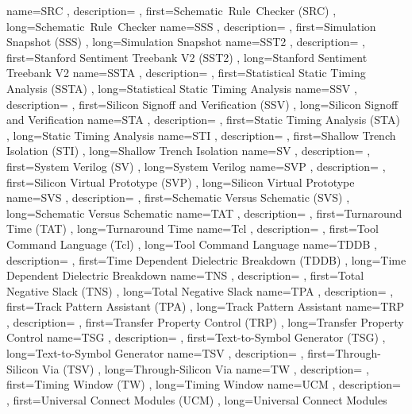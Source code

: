 { name={SRC}
, description={}
, first={Schematic~Rule~Checker (SRC)}
, long={Schematic~Rule~Checker}
}
{ name={SSS}
, description={}
, first={Simulation Snapshot (SSS)}
, long={Simulation Snapshot}
}
{ name={SST2}
, description={}
, first={Stanford Sentiment Treebank V2 (SST2)}
, long={Stanford Sentiment Treebank V2}
}
{ name={SSTA}
, description={}
, first={Statistical Static Timing Analysis (SSTA)}
, long={Statistical Static Timing Analysis}
}
{ name={SSV}
, description={}
, first={Silicon Signoff and Verification (SSV)}
, long={Silicon Signoff and Verification}
}
{ name={STA}
, description={}
, first={Static Timing Analysis (STA)}
, long={Static Timing Analysis}
}
{ name={STI}
, description={}
, first={Shallow Trench Isolation (STI)}
, long={Shallow Trench Isolation}
}
{ name={SV}
, description={}
, first={System Verilog (SV)}
, long={System Verilog}
}
{ name={SVP}
, description={}
, first={Silicon Virtual Prototype (SVP)}
, long={Silicon Virtual Prototype}
}
{ name={SVS}
, description={}
, first={Schematic Versus Schematic (SVS)}
, long={Schematic Versus Schematic}
}
{ name={TAT}
, description={}
, first={Turnaround Time (TAT)}
, long={Turnaround Time}
}
{ name={Tcl}
, description={}
, first={Tool Command Language (Tcl)}
, long={Tool Command Language}
}
{ name={TDDB}
, description={}
, first={Time Dependent Dielectric Breakdown (TDDB)}
, long={Time Dependent Dielectric Breakdown}
}
{ name={TNS}
, description={}
, first={Total Negative Slack (TNS)}
, long={Total Negative Slack}
}
{ name={TPA}
, description={}
, first={Track Pattern Assistant (TPA)}
, long={Track Pattern Assistant}
}
{ name={TRP}
, description={}
, first={Transfer Property Control (TRP)}
, long={Transfer Property Control}
}
{ name={TSG}
, description={}
, first={Text-to-Symbol Generator (TSG)}
, long={Text-to-Symbol Generator}
}
{ name={TSV}
, description={}
, first={Through-Silicon Via (TSV)}
, long={Through-Silicon Via}
}
{ name={TW}
, description={}
, first={Timing Window (TW)}
, long={Timing Window}
}
{ name={UCM}
, description={}
, first={Universal Connect Modules (UCM)}
, long={Universal Connect Modules}
}
